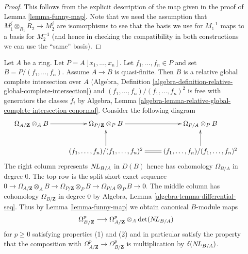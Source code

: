 \begin{proof}
This follows from the explicit description of the map given
in the proof of Lemma \ref{lemma-funny-map}. Note that we need
the assumption that $M_1^j \otimes_{R_1} R_2 \to M_2^j$ are isomorphisms
to see that the basis we use for $M_1^{-1}$ maps to a basis
for $M_2^{-1}$ (and hence in checking the compatibility in
both constructions we can use the ``same'' basis).
\end{proof}

\begin{remark}
\label{remark-local-description}
Let $A$ be a ring. Let $P = A[x_1, \ldots, x_n]$. Let
$f_1, \ldots, f_n \in P$ and set $B = P/(f_1, \ldots, f_n)$.
Assume $A \to B$ is quasi-finite. Then
$B$ is a relative global complete intersection over $A$ (Algebra, Definition
\ref{algebra-definition-relative-global-complete-intersection}) and
$(f_1, \ldots, f_n)/(f_1, \ldots, f_n)^2$ is free with generators
the classes $\overline{f}_i$ by Algebra, Lemma
\ref{algebra-lemma-relative-global-complete-intersection-conormal}.
Consider the following diagram
$$
\xymatrix{
\Omega_{A/\mathbf{Z}} \otimes_A B \ar[r] &
\Omega_{P/\mathbf{Z}} \otimes_P B \ar[r] &
\Omega_{P/A} \otimes_P B \\
&
(f_1, \ldots, f_n)/(f_1, \ldots, f_n)^2 \ar[u] \ar@{=}[r] &
(f_1, \ldots, f_n)/(f_1, \ldots, f_n)^2 \ar[u]
}
$$
The right column represents $\mathop{N\!L}\nolimits_{B/A}$ in $D(B)$ hence has cohomology
$\Omega_{B/A}$ in degree $0$. The top row is the split short exact sequence
$0 \to \Omega_{A/\mathbf{Z}} \otimes_A B \to
\Omega_{P/\mathbf{Z}} \otimes_P B \to \Omega_{P/A} \otimes_P B \to 0$.
The middle column has cohomology $\Omega_{B/\mathbf{Z}}$ in degree $0$
by Algebra, Lemma \ref{algebra-lemma-differential-seq}.
Thus by Lemma \ref{lemma-funny-map} we obtain canonical $B$-module maps
$$
\Omega^p_{B/\mathbf{Z}} \longrightarrow
\Omega^p_{A/\mathbf{Z}} \otimes_A \det(\mathop{N\!L}\nolimits_{B/A})
$$
for $p \geq 0$ satisfying properties (1) and (2) and in particular
satisfy the property that the composition with
$\Omega^p_{A/\mathbf{Z}} \to \Omega^p_{B/\mathbf{Z}}$
is multiplication by $\delta(\mathop{N\!L}\nolimits_{B/A})$.
\end{remark}

